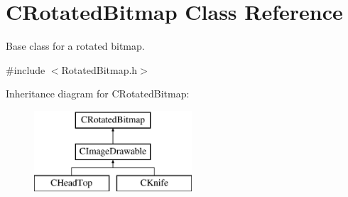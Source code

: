 \hypertarget{class_c_rotated_bitmap}{\section{C\+Rotated\+Bitmap Class Reference}
\label{class_c_rotated_bitmap}
}


Base class for a rotated bitmap.  




{\ttfamily \#include $<$Rotated\+Bitmap.\+h$>$}

Inheritance diagram for C\+Rotated\+Bitmap\+:\begin{figure}[H]
\begin{center}
\leavevmode
\includegraphics[height=3.000000cm]{class_c_rotated_bitmap}
\end{center}
\end{figure}
